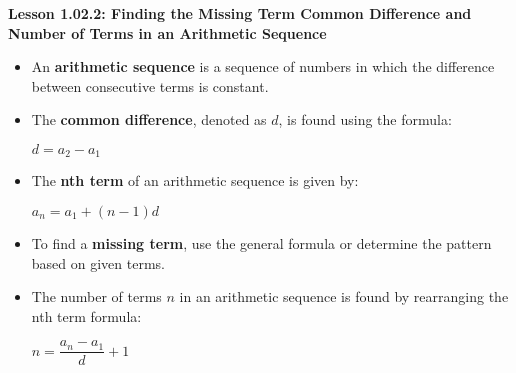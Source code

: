 \begin{center}
\textbf{Lesson 1.02.2: Finding the Missing Term Common Difference and Number of Terms in an Arithmetic Sequence}
\end{center}

\vspace*{-1.5ex}

\begin{itemize}
    \item An \textbf{arithmetic sequence} is a sequence of numbers in which the difference between consecutive terms is constant.
    \item The \textbf{common difference}, denoted as $d$, is found using the formula:

      {\centering $ d = a_2 - a_1  $\par}
    \item The \textbf{nth term} of an arithmetic sequence is given by:

      {\centering $  a_n = a_1 + (n-1)d  $\par}
    \item To find a \textbf{missing term}, use the general formula or determine the pattern based on given terms.
    \item The number of terms $n$ in an arithmetic sequence is found by rearranging the nth term formula:

{\centering $ n = \dfrac{a_n - a_1}{d} + 1  $\par}
\end{itemize}
